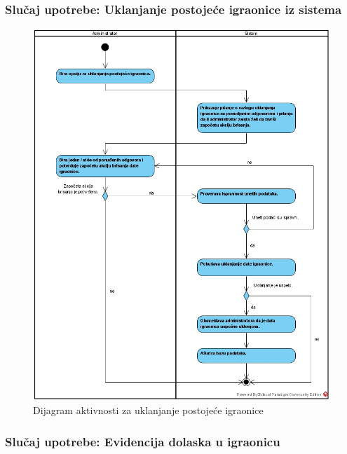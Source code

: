 \documentclass[a4paper]{article}
\begin{document}
\subsubsection{Slučaj upotrebe: Uklanjanje postojeće igraonice iz sistema}

\begin{figure}[!ht]
\begin{center}
\includegraphics[scale=0.47]{sections/images/dijagram_aktivnosti_uklanjanje_postojece_igraonice.jpg}
\end{center}
\caption{Dijagram aktivnosti za uklanjanje postojeće igraonice}
\label{fig:kontekst}
\end{figure}

\subsubsection{Slučaj upotrebe: Evidencija dolaska u igraonicu}

\end{document}
